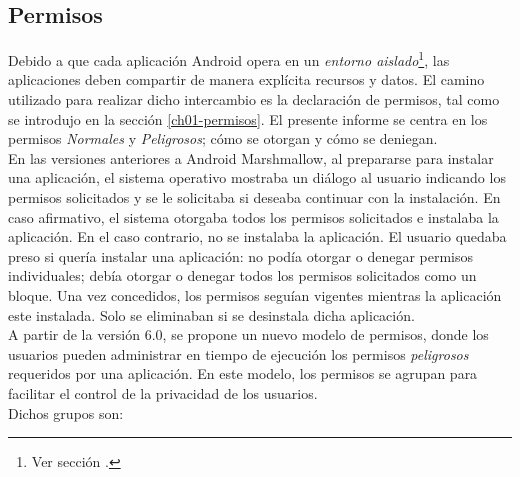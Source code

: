 \subsection{Permisos}
Debido a que cada aplicación Android opera en un \emph{entorno aislado}\footnote{Ver sección .}, las aplicaciones deben compartir de manera explícita recursos y datos. El camino utilizado para realizar dicho intercambio es la declaración de permisos, tal como se introdujo en la sección \ref{ch01-permisos}. El presente informe se centra en los permisos \emph{Normales} y \emph{Peligrosos}; cómo se otorgan y cómo se deniegan.\\
En las versiones anteriores a Android Marshmallow, al prepararse para instalar una aplicación, el sistema operativo mostraba un diálogo al usuario indicando los permisos solicitados y se le solicitaba si deseaba continuar con la instalación. En caso afirmativo, el sistema otorgaba todos los permisos solicitados e instalaba la aplicación. En el caso contrario, no se instalaba la aplicación. El usuario quedaba preso si quería instalar una aplicación: no podía otorgar o denegar permisos individuales; debía otorgar o denegar todos los permisos solicitados como un bloque. Una vez concedidos, los permisos seguían vigentes mientras la aplicación este instalada. Solo se eliminaban si se desinstala dicha aplicación.\\
A partir de la versión 6.0, se propone un nuevo modelo de permisos, donde los usuarios pueden administrar en tiempo de ejecución los permisos \emph{peligrosos} requeridos por una aplicación. En este modelo, los permisos se agrupan para facilitar el control de la privacidad de los usuarios.\\
Dichos grupos son:
